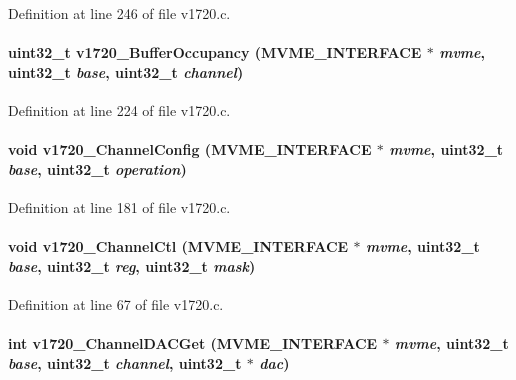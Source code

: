 Definition at line 246 of file v1720.c.
\paragraph[{v1720\_\-BufferOccupancy}]{\setlength{\rightskip}{0pt plus 5cm}uint32\_\-t v1720\_\-BufferOccupancy ({\bf MVME\_\-INTERFACE} $\ast$ {\em mvme}, \/  uint32\_\-t {\em base}, \/  uint32\_\-t {\em channel})}\hfill\label{v1720_8c_a2887e1a13eff57f887798358e6280d8a}


Definition at line 224 of file v1720.c.
\paragraph[{v1720\_\-ChannelConfig}]{\setlength{\rightskip}{0pt plus 5cm}void v1720\_\-ChannelConfig ({\bf MVME\_\-INTERFACE} $\ast$ {\em mvme}, \/  uint32\_\-t {\em base}, \/  uint32\_\-t {\em operation})}\hfill\label{v1720_8c_a37472870e9201758095f83eba3feb99b}


Definition at line 181 of file v1720.c.
\paragraph[{v1720\_\-ChannelCtl}]{\setlength{\rightskip}{0pt plus 5cm}void v1720\_\-ChannelCtl ({\bf MVME\_\-INTERFACE} $\ast$ {\em mvme}, \/  uint32\_\-t {\em base}, \/  uint32\_\-t {\em reg}, \/  uint32\_\-t {\em mask})}\hfill\label{v1720_8c_a8b262559130dc01afea23b3390f8af13}


Definition at line 67 of file v1720.c.
\paragraph[{v1720\_\-ChannelDACGet}]{\setlength{\rightskip}{0pt plus 5cm}int v1720\_\-ChannelDACGet ({\bf MVME\_\-INTERFACE} $\ast$ {\em mvme}, \/  uint32\_\-t {\em base}, \/  uint32\_\-t {\em channel}, \/  uint32\_\-t $\ast$ {\em dac})}\hfill\label{v1720_8c_a39043d4544279b4b83d0c03b92c98d31}


